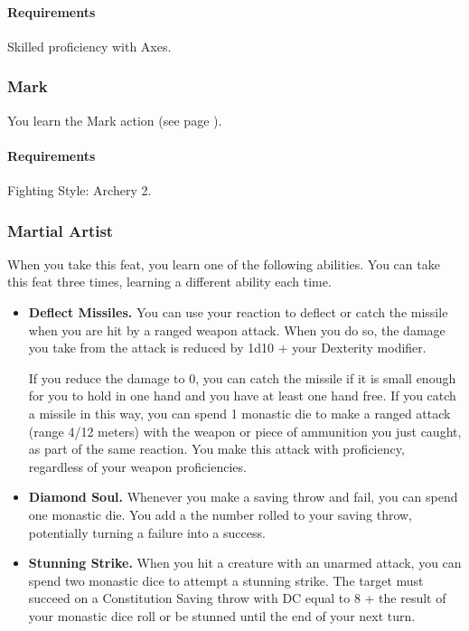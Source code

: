     \paragraph{Requirements} Skilled proficiency with Axes.
\subsubsection{Mark} \label{feat::mark}
    You learn the Mark action (see page \pageref{act::mark}).
    \paragraph{Requirements} Fighting Style: Archery 2.
\subsubsection{Martial Artist} \label{feat::martialartist}
    When you take this feat, you learn one of the following abilities.
    You can take this feat three times, learning a different ability each time.
    \begin{itemize}
        \item \textbf{Deflect Missiles.} You can use your reaction to deflect or catch the missile when you are hit by a ranged weapon attack.
        When you do so, the damage you take from the attack is reduced by 1d10 + your Dexterity modifier.

        If you reduce the damage to 0, you can catch the missile if it is small enough for you to hold in one hand and you have at least one hand free.
        If you catch a missile in this way, you can spend 1 monastic die to make a ranged attack (range 4/12 meters) with the weapon or piece of ammunition you just caught, as part of the same reaction.
        You make this attack with proficiency, regardless of your weapon proficiencies.

        \item \textbf{Diamond Soul.} Whenever you make a saving throw and fail, you can spend one monastic die.
        You add a the number rolled to your saving throw, potentially turning a failure into a success.

        \item \textbf{Stunning Strike.} When you hit a creature with an unarmed attack, you can spend two monastic dice to attempt a stunning strike.
        The target must succeed on a Constitution Saving throw with DC equal to 8 + the result of your monastic dice roll or be stunned until the end of your next turn.
    \end{itemize}

